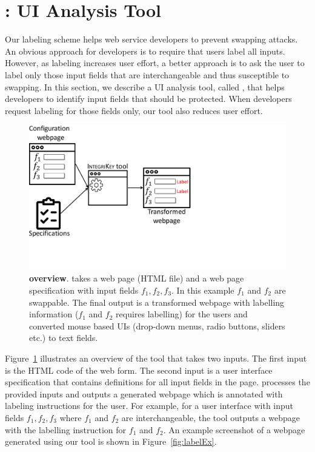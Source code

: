 \section{\tool: UI Analysis Tool}
\label{sec:integriTool}

Our labeling scheme helps web service developers to prevent swapping attacks. An obvious approach for developers is to require that users label all inputs. However, as labeling increases user effort, a better approach is to ask the user to label only those input fields that are interchangeable and thus susceptible to swapping. In this section, we describe a UI analysis tool, called \tool, that helps developers to identify input fields that should be protected. When developers request labeling for those fields only, our tool also reduces user effort.

\begin{figure}[t]
 \centering
 \includegraphics[trim={0 2.3cm 12cm 0},clip,width=0.6\linewidth]{chapters/IntegriKey/images/ServerSideTool.pdf}
 \caption[\tool overview]{\textbf{\tool overview}. \tool takes a web page (HTML file) and a web page specification with input fields $f_1, f_2, f_3$. In this example $f_1$ and $f_2$ are swappable. The final output is a transformed webpage with labelling information ($f_1$ and $f_2$ requires labelling) for the users and converted mouse based UIs (drop-down menus, radio buttons, sliders etc.) to text fields. 
 }
 \label{fig:tool}
\end{figure}

Figure~\ref{fig:tool} illustrates an overview of the tool that takes two inputs. The first input is the HTML code of the web form. The second input is a user interface specification that contains definitions for all input fields in the page. \tool processes the provided inputs and outputs a generated webpage which is annotated with labeling instructions for the user. For example, for a user interface with input fields $f_1, f_2, f_3$ where $f_1$ and $f_2$ are interchangeable, the tool outputs a webpage with the labelling instruction for $f_1$ and $f_2$. An example screenshot of a webpage generated using our tool is shown in Figure~\ref{fig:labelEx}.
 

